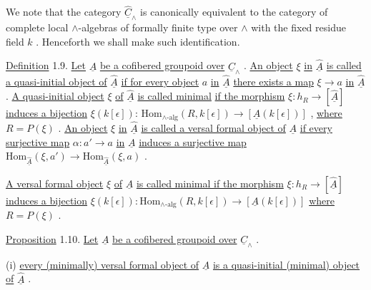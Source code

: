 \begin{center}
\end{center}
We note that the category  $\widehat{\underline{C}}_\wedge$  is canonically equivalent to the category of complete local $\wedge$-algebras of formally finite type over  $\wedge$  with the fixed residue field  $k$  . Henceforth we shall make such identification.

\underline{Definition} 1.9.   \underline{Let}  $\underline{A}$  \underline{be a cofibered groupoid over}  $\underline{C}_\wedge$  . \underline{An object}  $\xi$  \underline{in} $\widehat{\underline{A}}$  \underline{is called a quasi-initial object of}  $\widehat{\underline{A}}$  \underline{if for every object}  $a$  \underline{in}  $\widehat{\underline{A}}$  \underline{there exists a map}  $\xi \to a$  \underline{in}  $\widehat{\underline{A}}$  . \underline{A quasi-initial object}  $\xi$  \underline{of}  $\widehat{\underline{A}}$  \underline{is called minimal}
\underline{if the morphism}  $\xi : h_R \to [\hat{\underline{A}}]$  \underline{induces a bijection} $\xi(k[\epsilon])$: $\mathrm{Hom}_{\wedge\text{-alg}}(R,k[\epsilon]) \to [\underline{A}(k[\epsilon])]$ , \underline{where} $R = P(\xi)$ . \underline{An object} $\xi$ \underline{in} $\hat{\underline{A}}$ \underline{is called a versal formal object of} $\underline{A}$ \underline{if every surjective map} $\alpha : a' \to a$ \underline{in} $\underline{A}$ \underline{induces a surjective map} $\mathrm{Hom}_{\hat{\underline{A}}}(\xi,a') \to \mathrm{Hom}_{\hat{\underline{A}}}(\xi,a)$ .

\underline{A versal formal object} $\xi$ \underline{of} $\underline{A}$ \underline{is called minimal if the morphism} $\xi : h_R \to [\hat{\underline{A}}]$ \underline{induces a bijection} $\xi(k[\epsilon]) : \mathrm{Hom}_{\wedge\text{-alg}}(R,k[\epsilon]) \to [\underline{A}(k[\epsilon])]$ \underline{where} $R = P(\xi)$ .

\underline{Proposition} 1.10.  \underline{Let} $\underline{A}$ \underline{be a cofibered groupoid over} $\underline{C}_{\wedge}$ .

  (i)  \underline{every (minimally) versal formal object of} $\underline{A}$ \underline{is a quasi-initial (minimal) object of} $\hat{\underline{A}}$ .

